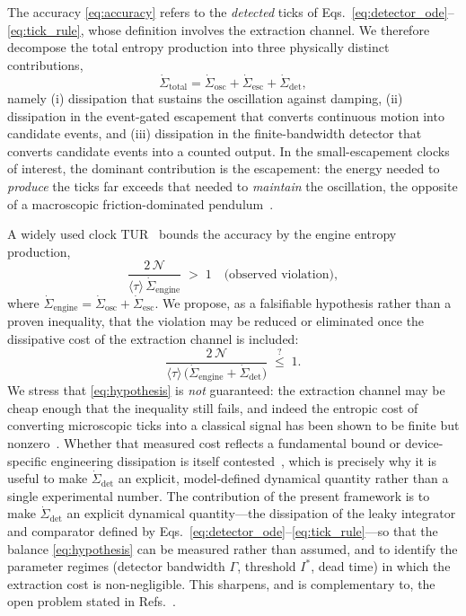 \documentclass[aps,pre,reprint,amsmath,amssymb,floatfix,nofootinbib]{revtex4-2}
\newcommand{\avg}[1]{\langle #1 \rangle}
\newcommand{\Sdot}{\dot{\Sigma}}
\begin{document}
The accuracy \eqref{eq:accuracy} refers to the \emph{detected} ticks of
Eqs.~\eqref{eq:detector_ode}--\eqref{eq:tick_rule}, whose definition involves the extraction
channel. We therefore decompose the total entropy production into three
physically distinct contributions,
\begin{equation}
  \Sdot_{\mathrm{total}}
  = \Sdot_{\mathrm{osc}} + \Sdot_{\mathrm{esc}} + \Sdot_{\mathrm{det}},
  \label{eq:sigma_total}
\end{equation}
namely (i) dissipation that sustains the oscillation against damping,
(ii) dissipation in the event-gated escapement that converts continuous
motion into candidate events, and (iii) dissipation in the
finite-bandwidth detector that converts candidate events into a counted
output. In the small-escapement clocks of interest, the dominant
contribution is the escapement: the energy needed to \emph{produce} the
ticks far exceeds that needed to \emph{maintain} the oscillation, the
opposite of a macroscopic friction-dominated pendulum~\cite{Brunelli2026}.

A widely used clock TUR~\cite{Culhane2024,Meier2025} bounds the accuracy
by the engine entropy production,
\begin{equation}
  \frac{2\,\mathcal{N}}{\avg{\tau}\,\Sdot_{\mathrm{engine}}} \;>\; 1
  \quad\text{(observed violation)} ,
  \label{eq:viol}
\end{equation}
where $\Sdot_{\mathrm{engine}}=\Sdot_{\mathrm{osc}}+\Sdot_{\mathrm{esc}}$.
We propose, as a falsifiable hypothesis rather than a proven inequality,
that the violation may be reduced or eliminated once the dissipative cost
of the extraction channel is included:
\begin{equation}
  \frac{2\,\mathcal{N}}
       {\avg{\tau}\,\big(\Sdot_{\mathrm{engine}}+\Sdot_{\mathrm{det}}\big)}
  \;\overset{?}{\le}\; 1 .
  \label{eq:hypothesis}
\end{equation}
We stress that \eqref{eq:hypothesis} is \emph{not} guaranteed: the
extraction channel may be cheap enough that the inequality still fails,
and indeed the entropic cost of converting microscopic ticks into a
classical signal has been shown to be finite but
nonzero~\cite{Wadhia2025}. Whether that measured cost reflects a
fundamental bound or device-specific engineering dissipation is itself
contested~\cite{Gong2026Comment}, which is precisely why it is useful to
make $\Sdot_{\mathrm{det}}$ an explicit, model-defined dynamical quantity
rather than a single experimental number. The contribution of the present framework is
to make $\Sdot_{\mathrm{det}}$ an explicit dynamical quantity---the
dissipation of the leaky integrator and comparator defined by
Eqs.~\eqref{eq:detector_ode}--\eqref{eq:tick_rule}---so that the balance \eqref{eq:hypothesis} can
be measured rather than assumed, and to identify the parameter regimes
(detector bandwidth $\Gamma$, threshold $I^\ast$, dead time) in which the
extraction cost is non-negligible. This sharpens, and is complementary
to, the open problem stated in Refs.~\cite{Brunelli2026,Wadhia2025}.
\end{document}
